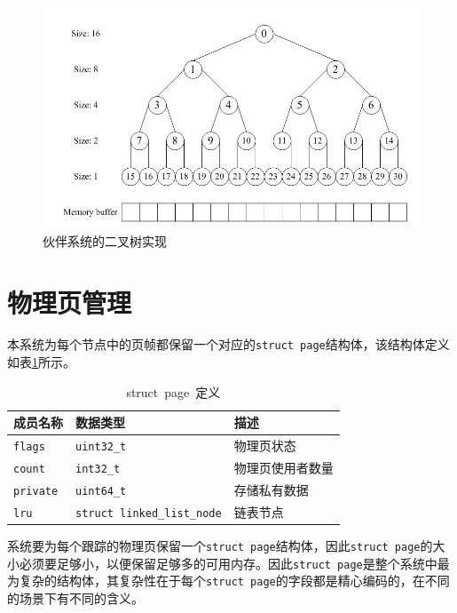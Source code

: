 \documentclass[AutoFakeBold]{LZUThesis}
\begin{document}
\begin{sloppypar}
\begin{figure}
\centering
\includegraphics[width=400pt]{images/buddy-system-binary-tree-implementation.jpg}
\caption{伙伴系统的二叉树实现}
\label{figure:buddy-system-binary-tree-implementation}
\end{figure}


\section{物理页管理}

本系统为每个节点中的页帧都保留一个对应的\texttt{struct\ page}结构体，该结构体定义如表\ref{table:struct-page-definition}所示。

\begin{longtable}[]{@{}lll@{}}
\caption{struct\ page\ 定义}\label{table:struct-page-definition} \\
\toprule\noalign{}
成员名称 & 数据类型 & 描述 \\
\midrule\noalign{}
\endhead
\bottomrule\noalign{}
\endlastfoot
\texttt{flags} & \texttt{uint32\_t} & 物理页状态 \\
\texttt{count} & \texttt{int32\_t} & 物理页使用者数量 \\
\texttt{private} & \texttt{uint64\_t} & 存储私有数据 \\
\texttt{lru} & \texttt{struct\ linked\_list\_node} & 链表节点 \\
\end{longtable}

系统要为每个跟踪的物理页保留一个\texttt{struct\ page}结构体，因此\texttt{struct\ page}的大小必须要足够小，以便保留足够多的可用内存。因此\texttt{struct\ page}是整个系统中最为复杂的结构体，其复杂性在于每个\texttt{struct\ page}的字段都是精心编码的，在不同的场景下有不同的含义。


\end{sloppypar}
\end{document}
